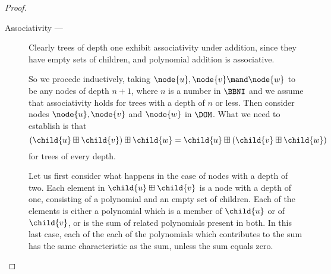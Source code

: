 \begin{definition}
\begin{proposition}
\begin{proof}
\begin{description}
    \item[Associativity --- ] %
      Clearly trees of depth one exhibit associativity under addition, since
      they have empty sets of children, and polynomial addition is associative.

      So we procede inductively, taking $\node{u},\node{v}\mand\node{w}$ to be
      any nodes of depth $n+1$, where $n$ is a number in $\BBNI$ and we assume
      that associativity holds for trees with a depth of $n$ or less. Then
      consider nodes $\node{u}, \node{v}$ and $\node{w}$ in $\DOM$. What we need
      to establish is that 
      \[(\child{u}\boxplus\child{v})\boxplus\child{w} =
      \child{u}\boxplus(\child{v}\boxplus\child{w})\] for trees of
      every depth.

      Let us first consider what happens in the case of nodes with a depth of
      two.  Each element in $\child{u}\boxplus\child{v}$ is a node with a depth
      of one, consisting of a polynomial and an empty set of children. Each of
      the elements is either a polynomial which is a member of $\child{u}$ or of
      $\child{v}$, or is the sum of related polynomials present in both. In this
      last case, each of the each of the polynomials which contributes to the
      sum has the same characteristic as the sum, unless the sum equals zero.
      

      




\end{description}
\end{proof}
\end{proposition}
\end{definition}
